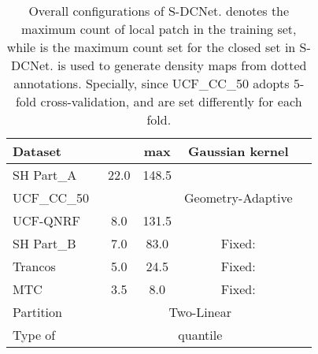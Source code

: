 \documentclass[10pt,twocolumn,letterpaper]{article}
\begin{document}
	
	\begin{table}\footnotesize
		\centering
		\addtolength{\tabcolsep}{4pt}
		\begin{tabular}{|l|c|c|c|c|}
			\hline
			Dataset &  &max& Gaussian kernel\\
			\hline
			SH Part\_A~\cite{MCNN_2016_CVPR}&22.0	& 148.5 &\multirow{3}{*}{Geometry-Adaptive}\\ \cline{1-3} 
			UCF\_CC\_50~\cite{UCFCC50_2013_CVPR}&  &  &\\	\cline{1-3} 
			UCF-QNRF~\cite{Compose_Loss_2018_ECCV}& 8.0 & 131.5& \\ \cline{1-4}
			SH Part\_B~\cite{MCNN_2016_CVPR}& 7.0 & 83.0&  Fixed: \\ \cline{1-4}
			Trancos~\cite{TRANCOSdataset_IbPRIA2015}& 5.0 & 24.5& Fixed: \\	   \cline{1-4}
			MTC~\cite{Lu2017TasselNet}& 3.5 & 8.0& Fixed: \\	   \cline{1-4}
			\hline
			Partition& \multicolumn{3}{c|}{Two-Linear}\\ \cline{1-4}
			Type of~ &\multicolumn{3}{c|}{ quantile}\\ \cline{1-4}
			\hline
		\end{tabular}
		\vspace{5pt}
		\caption{Overall configurations of S-DCNet.  denotes the maximum count of local patch in the training set, while  is the maximum count set for the closed set in S-DCNet.  is used to generate density maps from dotted annotations. Specially, since UCF\_CC\_50 adopts 5-fold cross-validation,  and  are set differently for each fold.}
		\label{tab:compare_setting}
		\vspace{-10pt}
	\end{table} 
	
\end{document}
